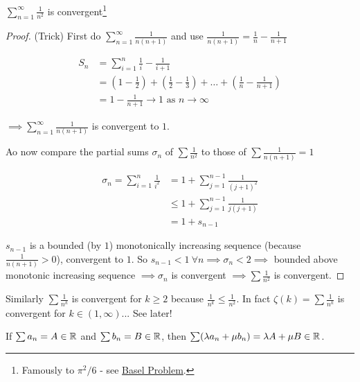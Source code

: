 \documentclass[twoside]{scrartcl}
\begin{document}
\begin{example}
$\displaystyle{\sum_{n=1}^{\infty} \frac{1}{n^2}}$ is convergent\footnote{Famously to $\pi^2/6$ - see \href{https://en.wikipedia.org/wiki/Basel_problem}{Basel Problem}.} 	

\begin{proof}(Trick) First do $\sum_{n=1}^\infty \frac{1}{n(n+1)}$ and use $\frac{1}{n(n+1)} = \frac{1}{n} - \frac{1}{n+1}$

\[\begin{aligned}
S_n &= \sum_{i=1}^n \frac{1}{i} - \frac{1}{i+1} \\
&= \textstyle{(1-\frac{1}{2}) + (\frac{1}{2} - \frac{1}{3}) + \dots + (\frac{1}{n} - \frac{1}{n+1})}\\
&= 1 - \frac{1}{n+1} \to 1 \text{ as } n \to \infty	
\end{aligned}
\]

$\implies \sum_{n=1}^\infty \frac{1}{n(n+1)}$ is convergent to $1$.

Ao now compare the partial sums $\sigma_n$ of $\sum \frac{1}{n^2}$ to those of $\sum \frac{1}{n(n+1)} = 1$

\[\begin{aligned}
\sigma_n = \sum_{i=1}^n \frac{1}{i^2} &= 1 + \sum_{j=1}^{n-1} \frac{1}{(j+1)^2} \\
&\leq 1 + \sum_{j=1}^{n-1}\frac{1}{j(j+1)}\\
&= 1 + s_{n-1}	
\end{aligned}
\]

$s_{n-1}$ is a bounded (by $1$) monotonically increasing sequence (because $\frac{1}{n(n+1)} >0$), convergent to $1$. So $s_{n-1} < 1~\forall n \implies \sigma_n < 2 \implies$ bounded above monotonic increasing sequence $\implies \sigma_n$ is convergent $\implies \sum \frac{1}{n^2}$ is convergent.	
\end{proof}
\end{example}\vspace*{5pt}


Similarly $\sum \frac{1}{n^k}$ is convergent for $k \geq 2$ because $\frac{1}{n^k} \leq \frac{1}{n^2}$. In fact $\zeta(k) = \sum \frac{1}{n^k}$ is convergent for $k \in (1,\infty)$... See later!\\


\begin{theorem}

If $\sum a_n = A \in\mathbb{R}$ and $\sum b_n = B \in\mathbb{R}$, then $\sum (\lambda a_n + \mu b_n) = \lambda A + \mu B \in\mathbb{R}$. 
\end{theorem}
\end{document}
